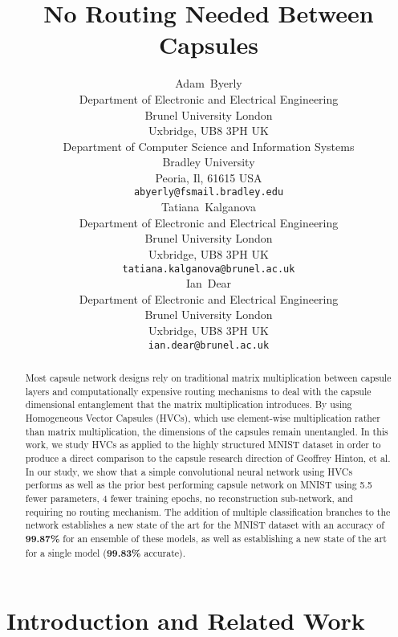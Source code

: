 \documentclass{article}
\date{} \renewcommand{\undertitle}{} \renewcommand{\headeright}{}
\title{No Routing Needed Between Capsules}
\author{
  Adam~Byerly\\
  Department of Electronic and Electrical Engineering\\
  Brunel University London\\
  Uxbridge, UB8 3PH UK \\
  Department of Computer Science and Information Systems\\
  Bradley University\\
  Peoria, Il, 61615 USA\\
  \texttt{abyerly@fsmail.bradley.edu} \\
  \And{}
  Tatiana~Kalganova \\
  Department of Electronic and Electrical Engineering\\
  Brunel University London\\
  Uxbridge, UB8 3PH UK \\
  \texttt{tatiana.kalganova@brunel.ac.uk} \\
  \And{}
  Ian~Dear \\
  Department of Electronic and Electrical Engineering\\
  Brunel University London\\
  Uxbridge, UB8 3PH UK \\
  \texttt{ian.dear@brunel.ac.uk}
}
\begin{document}
\maketitle

\begin{abstract}
  Most capsule network designs rely on traditional matrix multiplication between capsule layers and computationally expensive routing mechanisms to deal with the capsule dimensional entanglement that the matrix multiplication introduces.  By using Homogeneous Vector Capsules (HVCs), which use element-wise multiplication rather than matrix multiplication, the dimensions of the capsules remain unentangled.  In this work, we study HVCs as applied to the highly structured MNIST dataset in order to produce a direct comparison to the capsule research direction of Geoffrey Hinton, et al.  In our study, we show that a simple convolutional neural network using HVCs performs as well as the prior best performing capsule network on MNIST using 5.5 fewer parameters, 4 fewer training epochs, no reconstruction sub-network, and requiring no routing mechanism.  The addition of multiple classification branches to the network establishes a new state of the art for the MNIST dataset with an accuracy of \textbf{99.87\%} for an ensemble of these models, as well as establishing a new state of the art for a single model (\textbf{99.83\%} accurate).
\end{abstract}


\section{Introduction and Related Work}\label{sec:introduction}
\end{document}

